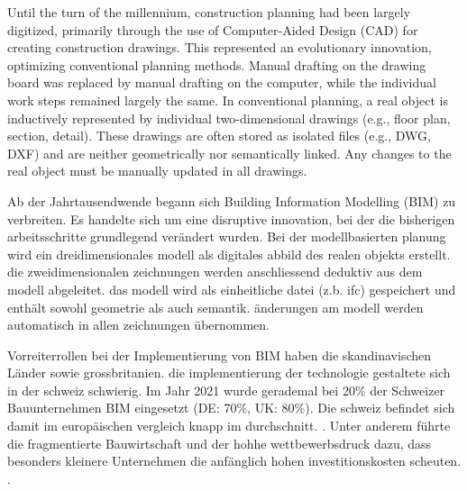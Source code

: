 \begin{English}
    Until the turn of the millennium, construction planning had been largely digitized, primarily through the use of Computer-Aided Design (CAD) for creating construction drawings. This represented an evolutionary innovation, optimizing conventional planning methods. Manual drafting on the drawing board was replaced by manual drafting on the computer, while the individual work steps remained largely the same. In conventional planning, a real object is inductively represented by individual two-dimensional drawings (e.g., floor plan, section, detail). These drawings are often stored as isolated files (e.g., DWG, DXF) and are neither geometrically nor semantically linked. Any changes to the real object must be manually updated in all drawings.
\end{English}

\begin{German}
    Ab der Jahrtausendwende begann sich Building Information Modelling (BIM) zu verbreiten. Es handelte sich um eine disruptive innovation, bei der die bisherigen arbeitsschritte grundlegend verändert wurden. Bei der modellbasierten planung wird ein dreidimensionales modell als digitales abbild des realen objekts erstellt. die zweidimensionalen zeichnungen werden anschliessend deduktiv aus dem modell abgeleitet. das modell wird als einheitliche datei (z.b. ifc) gespeichert und enthält sowohl geometrie als auch semantik. änderungen am modell werden automatisch in allen zeichnungen übernommen.

    Vorreiterrollen bei der Implementierung von BIM haben die skandinavischen Länder sowie grossbritanien. die implementierung der technologie gestaltete sich in der schweiz schwierig. Im Jahr 2021 wurde gerademal bei 20\% der Schweizer Bauunternehmen BIM eingesetzt (DE: 70\%, UK: 80\%). Die schweiz befindet sich damit im europäischen vergleich knapp im durchschnitt. \cite{heinrichSchweizImBIMEuropavergleich2022}. Unter anderem führte die fragmentierte Bauwirtschaft und der hohhe wettbewerbsdruck dazu, dass besonders kleinere Unternehmen die anfänglich hohen investitionskosten scheuten. \cite{ivanicErfolgreicheEinfuehrungBuilding2020}.
\end{German}

